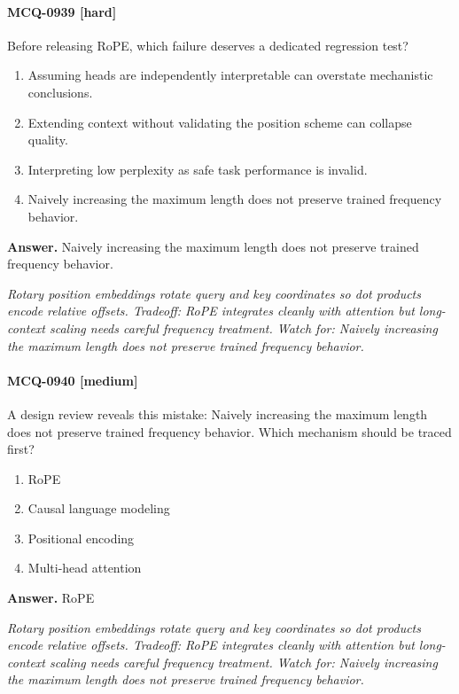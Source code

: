 \paragraph{MCQ-0939 [hard]} Before releasing RoPE, which failure deserves a dedicated regression test?
\begin{enumerate}[label=\Alph*.]
\item Assuming heads are independently interpretable can overstate mechanistic conclusions.
\item Extending context without validating the position scheme can collapse quality.
\item Interpreting low perplexity as safe task performance is invalid.
\item Naively increasing the maximum length does not preserve trained frequency behavior.
\end{enumerate}
\noindent\textbf{Answer.} Naively increasing the maximum length does not preserve trained frequency behavior.
\par\textit{Rotary position embeddings rotate query and key coordinates so dot products encode relative offsets. Tradeoff: RoPE integrates cleanly with attention but long-context scaling needs careful frequency treatment. Watch for: Naively increasing the maximum length does not preserve trained frequency behavior.}
\paragraph{MCQ-0940 [medium]} A design review reveals this mistake: Naively increasing the maximum length does not preserve trained frequency behavior. Which mechanism should be traced first?
\begin{enumerate}[label=\Alph*.]
\item RoPE
\item Causal language modeling
\item Positional encoding
\item Multi-head attention
\end{enumerate}
\noindent\textbf{Answer.} RoPE
\par\textit{Rotary position embeddings rotate query and key coordinates so dot products encode relative offsets. Tradeoff: RoPE integrates cleanly with attention but long-context scaling needs careful frequency treatment. Watch for: Naively increasing the maximum length does not preserve trained frequency behavior.}
